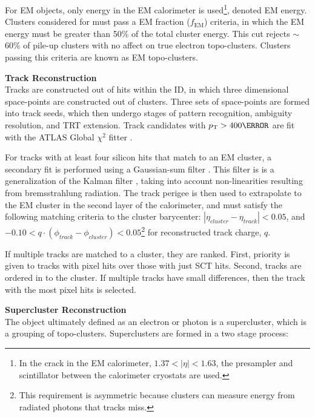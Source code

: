 For \gls{EM} objects, only energy in the \gls{EM} calorimeter is used\footnote{In the crack in the \gls{EM} calorimeter, $1.37<|\eta|<1.63$, the presampler and scintillator between the calorimeter cryostats are used.}, denoted \gls{EM} energy. Clusters considered for must pass a \gls{EM} fraction ($f_{\text{EM}}$) criteria, in which the \gls{EM} energy must be greater than 50\% of the total cluster energy. This cut rejects $\sim$60\% of pile-up clusters with no affect on true electron topo-clusters. Clusters passing this criteria are known as \gls{EM} topo-clusters.

\noindent\textbf{Track Reconstruction}\\ %
\indent Tracks are constructed out of hits within the \gls{ID}, in which three dimensional space-points are constructed out of clusters. Three sets of space-points are formed into track seeds, which then undergo stages of pattern recognition, ambiguity resolution, and \gls{TRT} extension. Track candidates with $\pt > \unit{400}{\MeV}$ are fit with the ATLAS Global $\chi^2$ fitter \cite{chi-2-fitter}.

For tracks with at least four silicon hits that match to an \gls{EM} cluster, a secondary fit is performed using a Gaussian-sum filter \cite{gaussian-sum-filter}. This filter is is a generalization of the Kalman filter \cite{kalman-filter}, taking into account non-linearities resulting from bremsstrahlung radiation. The track perigee is then used to extrapolate to the \gls{EM} cluster in the second layer of the calorimeter, and must satisfy the following matching criteria to the cluster barycenter: $|\eta_{cluster} - \eta_{track}| < 0.05$, and $-0.10 < q \cdot (\phi_{track}-\phi_{cluster}) < 0.05$\footnote{This requirement is asymmetric because clusters can measure energy from radiated photons that tracks miss.} for reconstructed track charge, $q$.

If multiple tracks are matched to a cluster, they are ranked. First, priority is given to tracks with pixel hits over those with just \gls{SCT} hits. Second, tracks are ordered in \Dr to the cluster. If multiple tracks have small \Dr differences, then the track with the most pixel hits is selected. 


\noindent\textbf{Supercluster Reconstruction}\\ 
\indent The object ultimately defined as an electron or photon is a supercluster, which is a grouping of topo-clusters.  Superclusters are formed in a two stage process:

